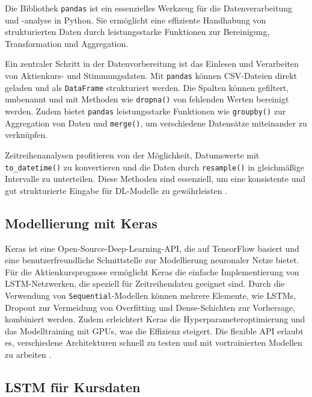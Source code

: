 Die Bibliothek \texttt{pandas} ist ein essenzielles Werkzeug für die Datenverarbeitung und -analyse in Python. Sie ermöglicht eine effiziente Handhabung von strukturierten Daten durch leistungsstarke Funktionen zur Bereinigung, Transformation und Aggregation.

Ein zentraler Schritt in der Datenvorbereitung ist das Einlesen und Verarbeiten von Aktienkurs- und Stimmungsdaten. Mit \texttt{pandas} können \ac{CSV}-Dateien direkt geladen und als \texttt{DataFrame} strukturiert werden. Die Spalten können gefiltert, umbenannt und mit Methoden wie \texttt{dropna()} von fehlenden Werten bereinigt werden. Zudem bietet \texttt{pandas} leistungsstarke Funktionen wie \texttt{groupby()} zur Aggregation von Daten und \texttt{merge()}, um verschiedene Datensätze miteinander zu verknüpfen.

Zeitreihenanalysen profitieren von der Möglichkeit, Datumswerte mit \texttt{to\_datetime()} zu konvertieren und die Daten durch \texttt{resample()} in gleichmäßige Intervalle zu unterteilen. Diese Methoden sind essenziell, um eine konsistente und gut strukturierte Eingabe für \ac{DL}-Modelle zu gewährleisten \autocite{han2022data}\autocite{jain2016time}.

\subsection{Modellierung mit Keras}\label{sec:modellierung-keras}

Keras ist eine Open-Source-Deep-Learning-API, die auf TensorFlow basiert und eine benutzerfreundliche Schnittstelle zur Modellierung neuronaler Netze bietet. Für die Aktienkursprognose ermöglicht Keras die einfache Implementierung von \ac{LSTM}-Netzwerken, die speziell für Zeitreihendaten geeignet sind. Durch die Verwendung von \texttt{Sequential}-Modellen können mehrere Elemente, wie \acp{LSTM}, Dropout zur Vermeidung von Overfitting und Dense-Schichten zur Vorhersage, kombiniert werden. Zudem erleichtert Keras die Hyperparameteroptimierung und das Modelltraining mit GPUs, was die Effizienz steigert. Die flexible API erlaubt es, verschiedene Architekturen schnell zu testen und mit vortrainierten Modellen zu arbeiten \autocite{chollet2017deep}\autocite{brownlee2018deep}\autocite{abiodun2019comprehensive}.

\subsection{\acs{LSTM} für Kursdaten}\label{sec:theorie_lstm}

